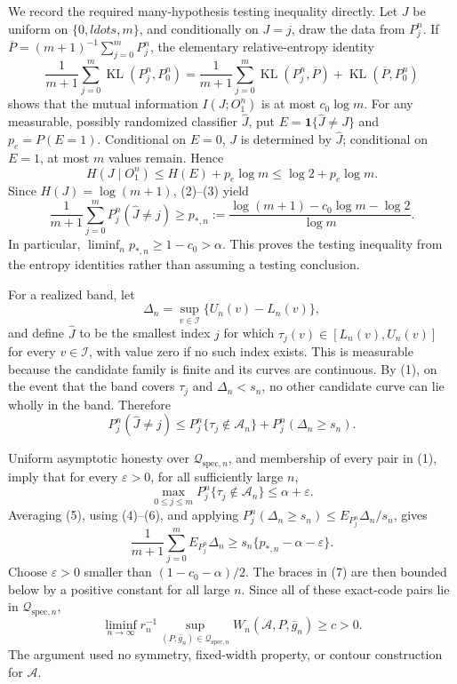 We record the required many-hypothesis testing inequality directly.  Let \(J\) be uniform on \(\{0,ldots,m\}\), and conditionally on \(J=j\), draw the data from \(P_j^n\).  If \(\overline P=(m+1)^{-1}\sum_{j=0}^mP_j^n\), the elementary relative-entropy identity
\[
 \frac1{m+1}\sum_{j=0}^m\operatorname{KL}(P_j^n,P_0^n)
 =\frac1{m+1}\sum_{j=0}^m\operatorname{KL}(P_j^n,\overline P)
 +\operatorname{KL}(\overline P,P_0^n) \tag{2}
\]
shows that the mutual information \(I(J;O_1^n)\) is at most \(c_0\log m\).  For any measurable, possibly randomized classifier \(\widehat J\), put \(E=\mathbf 1\{\widehat J\ne J\}\) and \(p_e=P(E=1)\).  Conditional on \(E=0\), \(J\) is determined by \(\widehat J\); conditional on \(E=1\), at most \(m\) values remain.  Hence
\[
 H(J\mid O_1^n)
 \le H(E)+p_e\log m
 \le\log2+p_e\log m. \tag{3}
\]
Since \(H(J)=\log(m+1)\), (2)--(3) yield
\[
 \frac1{m+1}\sum_{j=0}^mP_j^n(\widehat J\ne j)
 \ge p_{*,n}:=\frac{\log(m+1)-c_0\log m-\log2}{\log m}. \tag{4}
\]
In particular, \(\liminf_np_{*,n}\ge1-c_0>\alpha\).  This proves the testing inequality from the entropy identities rather than assuming a testing conclusion.

For a realized band, let
\[
 \Delta_n=\sup_{v\in\mathcal I}\{U_n(v)-L_n(v)\},
\]
and define \(\widehat J\) to be the smallest index \(j\) for which \(\tau_j(v)\in[L_n(v),U_n(v)]\) for every \(v\in\mathcal I\), with value zero if no such index exists.  This is measurable because the candidate family is finite and its curves are continuous.  By (1), on the event that the band covers \(\tau_j\) and \(\Delta_n<s_n\), no other candidate curve can lie wholly in the band.  Therefore
\[
 P_j^n(\widehat J\ne j)
 \le P_j^n\{\tau_j\notin\mathcal A_n\}
 +P_j^n(\Delta_n\ge s_n). \tag{5}
\]

Uniform asymptotic honesty over \(\mathcal Q_{\mathrm{spec},n}\), and membership of every pair in (1), imply that for every \(\varepsilon>0\), for all sufficiently large \(n\),
\[
 \max_{0\le j\le m}P_j^n\{\tau_j\notin\mathcal A_n\}
 \le\alpha+\varepsilon. \tag{6}
\]
Averaging (5), using (4)--(6), and applying
\(P_j^n(\Delta_n\ge s_n)\le E_{P_j^n}\Delta_n/s_n\), gives
\[
 \frac1{m+1}\sum_{j=0}^mE_{P_j^n}\Delta_n
 \ge s_n\{p_{*,n}-\alpha-\varepsilon\}. \tag{7}
\]
Choose \(\varepsilon>0\) smaller than \((1-c_0-\alpha)/2\).  The braces in (7) are then bounded below by a positive constant for all large \(n\).  Since all of these exact-code pairs lie in \(\mathcal Q_{\mathrm{spec},n}\),
\[
 \liminf_{n\to\infty}r_n^{-1}
 \sup_{(P,\bar g_n)\in\mathcal Q_{\mathrm{spec},n}}
 W_n(\mathcal A,P,\bar g_n)\ge c>0. \tag{8}
\]
The argument used no symmetry, fixed-width property, or contour construction for \(\mathcal A\).

